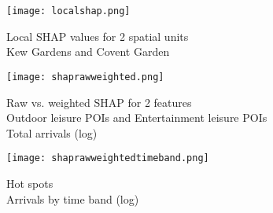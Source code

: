 \begin{figure}[!ht]
    \centering
    \texttt{[image: localshap.png]}
    \captionsetup{justification=centering}
    \caption{Local SHAP values for 2 spatial units\\Kew Gardens and Covent Garden}
    \label{fig:localshap}
\end{figure}



\begin{figure}[!ht]
    \centering
    \texttt{[image: shaprawweighted.png]}
    \captionsetup{justification=centering}
    \caption{Raw vs. weighted SHAP for 2 features\\Outdoor leisure POIs and Entertainment leisure POIs \\Total arrivals (log)}
    \label{fig:shaprawweighted}
\end{figure}

\begin{figure}[!ht]
    \centering
    \texttt{[image: shaprawweightedtimeband.png]}
    \captionsetup{justification=centering}
    \caption{Hot spots\\Arrivals by time band (log)}
    \label{fig:shaprawweightedtimeband}
\end{figure}